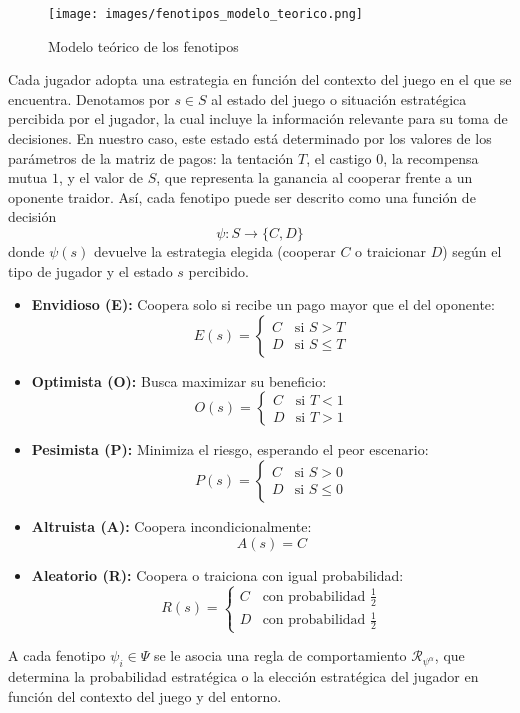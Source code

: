\documentclass[a4paper,12pt]{report}
\begin{document}
\newpage


\begin{figure}[h!]
    \centering
    \texttt{[image: images/fenotipos\_modelo\_teorico.png]}
    \label{fig:fenotipos-modelo}
    \caption{Modelo teórico de los fenotipos}
\end{figure}

Cada jugador adopta una estrategia en función del contexto del juego en el que se encuentra. Denotamos por \( s \in  S \)  al estado del juego o situación estratégica percibida por el jugador, la cual incluye la información relevante para su toma de decisiones. En nuestro caso, este estado está determinado por los valores de los parámetros de la matriz de pagos: la tentación \( T \), el castigo \( 0 \), la recompensa mutua \( 1 \), y el valor de \( S \), que representa la ganancia al cooperar frente a un oponente traidor. Así, cada fenotipo puede ser descrito como una función de decisión
\[
\psi : S \rightarrow \{C, D\}
\]
donde \( \psi(s) \) devuelve la estrategia elegida (cooperar \( C \) o traicionar \( D \)) según el tipo de jugador y el estado \( s \) percibido.


\begin{itemize}
  \item \textbf{Envidioso (E):} Coopera solo si recibe un pago mayor que el del oponente:
  \[
  E(s) =
  \begin{cases}
    C & \text{si } S > T \\
    D & \text{si } S \leq T
  \end{cases}
  \]

  \item \textbf{Optimista (O):} Busca maximizar su beneficio:
  \[
  O(s) =
  \begin{cases}
    C & \text{si } T < 1 \\
    D & \text{si } T > 1
  \end{cases}
  \]

  \item \textbf{Pesimista (P):} Minimiza el riesgo, esperando el peor escenario:
  \[
  P(s) =
  \begin{cases}
    C & \text{si } S > 0 \\
    D & \text{si } S \leq 0
  \end{cases}
  \]

  \item \textbf{Altruista (A):} Coopera incondicionalmente:
  \[
  A(s) = C
  \]

  \item \textbf{Aleatorio (R):} Coopera o traiciona con igual probabilidad:
  \[
  R(s) =
  \begin{cases}
    C & \text{con probabilidad } \frac{1}{2} \\
    D & \text{con probabilidad } \frac{1}{2}
  \end{cases}
  \]
\end{itemize}
\justifying
A cada fenotipo \( \psi_i \in \Psi \) se le asocia una regla de comportamiento \( \mathcal{R}_{\psi^\alpha} \), que determina la probabilidad estratégica o la elección estratégica del jugador en función del contexto del juego y del entorno.
\end{document}

